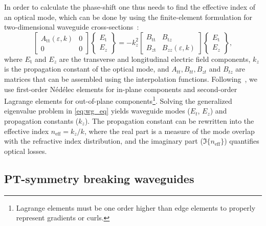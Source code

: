 In order to calculate the phase-shift one thus needs to find the effective index of an optical mode, which can be done by 
using the finite-element formulation for two-dimensional waveguide cross-sections~\cite{jin}:
\begin{equation}\label{eq:wg_eq}
    \left[\begin{array}{cc}
    A_{\text{tt}}(\varepsilon,k) & 0 \\
    0 & 0
    \end{array}\right]
    \left\{\begin{array}{l}
    E_{\text{t}} \\
    E_z
    \end{array}\right\}
    = -k_z^2
    \left[\begin{array}{cc}
    B_{\text{tt}} & B_{\text{t} z} \\
    B_{z \text{t}} & B_{z z}(\varepsilon,k)
    \end{array}\right]
    \left\{\begin{array}{c}
    E_{\text{t}} \\
    E_z
    \end{array}\right\},
    \end{equation}
where $E_{\text{t}}$ and $E_z$ are the transverse and longitudinal electric field components, $k_z$ is the propagation constant of the optical mode, and $A_{tt}, B_{tt},
B_{zt}$ and $B_{tz}$ are matrices that can be assembled using the interpolation functions. Following~\cite{jin}, we use first-order Nédélec elements for in-plane components and 
second-order Lagrange elements for out-of-plane components\footnote{Lagrange elements must be one order higher than edge elements to properly represent gradients or curls.}. 
Solving the generalized eigenvalue problem in \eqref{eq:wg_eq} yields waveguide modes ($E_t$, $E_z$) and propagation constants ($k_z$). The propagation constant can be rewritten into the effective index $n_\text{eff} = k_z / k$,
 where the real part is a measure of the mode overlap with the refractive index distribution, and the imaginary part ($\Im\{n_\text{eff}\}$) quantifies optical losses. 

 \subsection*{PT-symmetry breaking waveguides}

